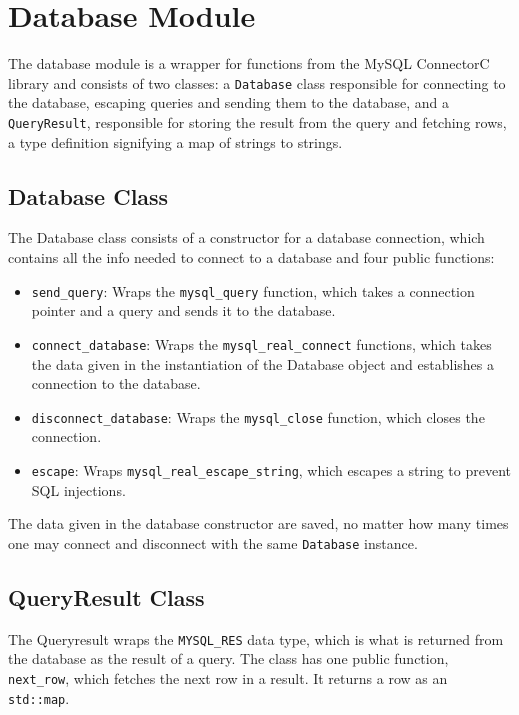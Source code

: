 \section{Database Module}
The database module is a wrapper for functions from the MySQL ConnectorC library and consists of two classes: a \lstinline|Database| class responsible for connecting to the database, escaping queries and sending them to the database, and a \lstinline|QueryResult|, responsible for storing the result from the query and fetching rows, a type definition signifying a map of strings to strings.

\subsection{Database Class}
The Database class consists of a constructor for a database connection, which contains all the info needed to connect to a database and four public functions:
\begin{itemize}
\item \lstinline|send_query|: Wraps the \lstinline|mysql_query| function, which takes a connection pointer and a query and sends it to the database.
\item \lstinline|connect_database|: Wraps the \lstinline|mysql_real_connect| functions, which takes the data given in the instantiation of the Database object and establishes a connection to the database.
\item \lstinline|disconnect_database|: Wraps the \lstinline|mysql_close| function, which closes the connection.
\item \lstinline|escape|: Wraps \lstinline|mysql_real_escape_string|, which escapes a string to prevent SQL injections.
\end{itemize} 

The data given in the database constructor are saved, no matter how many times one may connect and disconnect with the same \lstinline|Database| instance.

\subsection{QueryResult Class}
The Queryresult wraps the \lstinline|MYSQL_RES| data type, which is what is returned from the database as the result of a query. The class has one public function, \lstinline|next_row|, which fetches the next row in a result. It returns a row as an \lstinline|std::map|.
